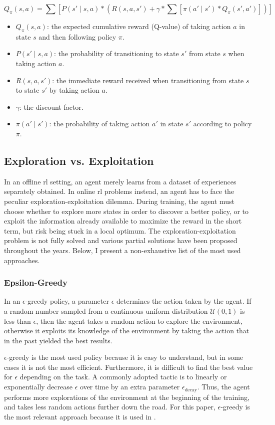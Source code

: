 $$
Q_\pi(s, a) = \sum [P(s' \mid s, a) * (R(s, a, s') + \gamma * \sum [\pi(a' \mid s') * Q_\pi(s', a')])]
$$

\begin{itemize}
    \item $Q_\pi(s, a)$: the expected cumulative reward (Q-value) of taking action $a$ in state $s$ and then following policy $\pi$.
    \item $P(s' \mid s, a)$: the probability of transitioning to state $s'$ from state $s$ when taking action $a$.
    \item $R(s, a, s')$: the immediate reward received when transitioning from state $s$ to state $s'$ by taking action $a$.
    \item $\gamma$: the discount factor.
    \item $\pi(a' \mid s')$: the probability of taking action $a'$ in state $s'$ according to policy $\pi$.
\end{itemize}

\subsection{Exploration vs. Exploitation}
In an offline \acrshort{rl} setting, an agent merely learns from a dataset of experiences separately obtained. In online \acrshort{rl} problems instead, an agent has to face the peculiar exploration-exploitation dilemma. During training, the agent must choose whether to explore more states in order to discover a better policy, or to exploit the information already available to maximize the reward in the short term, but risk being stuck in a local optimum. The exploration-exploitation problem is not fully solved and various partial solutions have been proposed throughout the years. Below, I present a non-exhaustive list of the most used approaches.

\subsubsection{Epsilon-Greedy}
In an $\epsilon$-greedy policy, a parameter $\epsilon$ determines the action taken by the agent. If a random number sampled from a continuous uniform distribution $\mathcal{U}(0, 1)$ is less than $\epsilon$, then the agent takes a random action to explore the environment, otherwise it exploits its knowledge of the environment by taking the action that in the past yielded the best results.

$\epsilon$-greedy is the most used policy because it is easy to understand, but in some cases it is not the most efficient. Furthermore, it is difficult to find the best value for $\epsilon$ depending on the task. A commonly adopted tactic is to linearly or exponentially decrease $\epsilon$ over time by an extra parameter $\epsilon_{\text{decay}}$. Thus, the agent performs more explorations of the environment at the beginning of the training, and takes less random actions further down the road. For this paper, $\epsilon$-greedy is the most relevant approach because it is used in .

